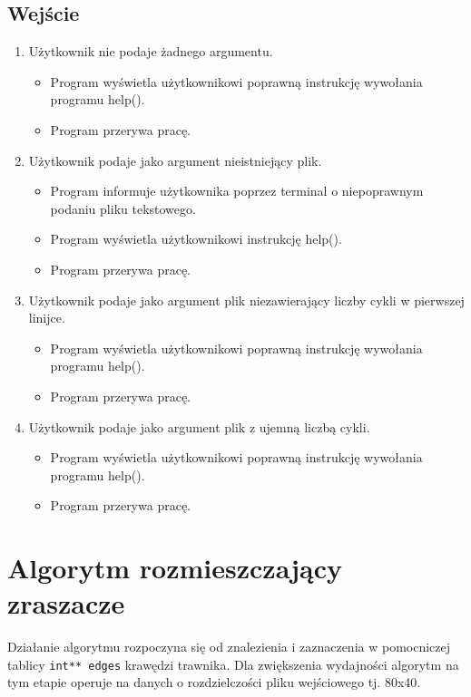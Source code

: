 \documentclass[a4paper]{article}
\begin{document}
\subsection{Wejście}
\begin{enumerate}
    \item Użytkownik nie podaje żadnego argumentu.
          \begin{itemize}
              \item Program wyświetla użytkownikowi poprawną instrukcję wywołania programu help().
              \item Program przerywa pracę.
          \end{itemize}
    \item Użytkownik podaje jako argument nieistniejący plik.
          \begin{itemize}
              \item Program informuje użytkownika poprzez terminal o niepoprawnym podaniu pliku tekstowego.
              \item Program wyświetla użytkownikowi instrukcję help().
              \item Program przerywa pracę.
          \end{itemize}
    \item Użytkownik podaje jako argument plik niezawierający liczby cykli w pierwszej linijce.
          \begin{itemize}
              \item Program wyświetla użytkownikowi poprawną instrukcję wywołania programu help().
              \item Program przerywa pracę.
          \end{itemize}
    \item Użytkownik podaje jako argument plik z ujemną liczbą cykli.
          \begin{itemize}
              \item Program wyświetla użytkownikowi poprawną instrukcję wywołania programu help().
              \item Program przerywa pracę.
          \end{itemize}
\end{enumerate}

\section{Algorytm rozmieszczający zraszacze}
Działanie algorytmu rozpoczyna się od znalezienia i zaznaczenia w pomocniczej tablicy \texttt{int** edges} krawędzi trawnika. Dla zwiększenia wydajności algorytm na tym etapie operuje na danych o rozdzielczości pliku wejściowego tj. 80x40.
\end{document}
